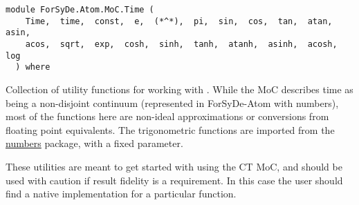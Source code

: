 \label{module:ForSyDe.Atom.MoC.Time}
\haddockbeginheader
{\haddockverb\begin{verbatim}
module ForSyDe.Atom.MoC.Time (
    Time,  time,  const,  e,  (*^*),  pi,  sin,  cos,  tan,  atan,  asin, 
    acos,  sqrt,  exp,  cosh,  sinh,  tanh,  atanh,  asinh,  acosh,  log
  ) where\end{verbatim}}
\haddockendheader

Collection of utility functions for working with . While the
  MoC describes time as being a non-disjoint
 continuum (represented in ForSyDe-Atom with  numbers),
 most of the functions here are non-ideal approximations or
 conversions from floating point equivalents. The trigonometric
 functions are imported from the
 \href{https://hackage.haskell.org/package/numbers-3000.2.0.1}{numbers}
 package, with a fixed  parameter.\par
These utilities are meant to get started with using the CT MoC, and
 should be used with caution if result fidelity is a requirement. In
 this case the user should find a native  implementation
 for a particular function.\par

